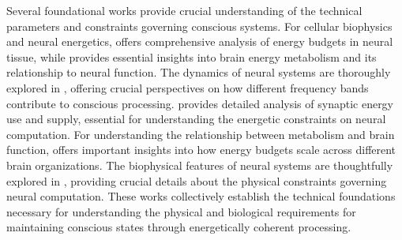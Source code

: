 Several foundational works provide crucial understanding of the technical parameters and constraints governing conscious systems. For cellular biophysics and neural energetics, \cite{attwell2001energy} offers comprehensive analysis of energy budgets in neural tissue, while \cite{magistretti2015cellular} provides essential insights into brain energy metabolism and its relationship to neural function. The dynamics of neural systems are thoroughly explored in \cite{buzsaki2006rhythms}, offering crucial perspectives on how different frequency bands contribute to conscious processing. \cite{harris2012synaptic} provides detailed analysis of synaptic energy use and supply, essential for understanding the energetic constraints on neural computation. For understanding the relationship between metabolism and brain function, \cite{herculano2011scaling} offers important insights into how energy budgets scale across different brain organizations. The biophysical features of neural systems are thoughtfully explored in \cite{georgiou2012biophysical}, providing crucial details about the physical constraints governing neural computation. These works collectively establish the technical foundations necessary for understanding the physical and biological requirements for maintaining conscious states through energetically coherent processing.